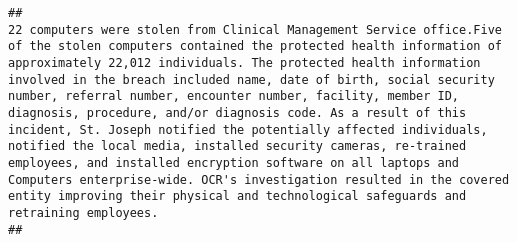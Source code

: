 \documentclass[
]{article}
\begin{document}
\begin{verbatim}
##                                                                                                                                                                                                                                            22 computers were stolen from Clinical Management Service office.Five of the stolen computers contained the protected health information of approximately 22,012 individuals. The protected health information involved in the breach included name, date of birth, social security number, referral number, encounter number, facility, member ID, diagnosis, procedure, and/or diagnosis code. As a result of this incident, St. Joseph notified the potentially affected individuals, notified the local media, installed security cameras, re-trained employees, and installed encryption software on all laptops and Computers enterprise-wide. OCR's investigation resulted in the covered entity improving their physical and technological safeguards and retraining employees.
## 

\end{verbatim}
\end{document}
